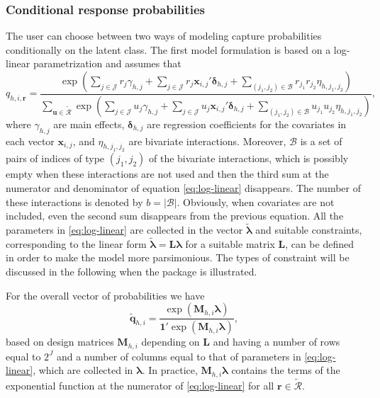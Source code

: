 \subsubsection{Conditional response probabilities}
%
The user can choose between two ways of modeling capture probabilities conditionally on the latent class.
The first model formulation is based on a log-linear parametrization and assumes that
%
\begin{equation}
q_{h,i,\bm{r}} = \frac{\exp\left(\sum_{j\in\mathcal{J}}r_j\gamma_{h,j}+\sum_{j\in\mathcal{J}}r_j\bm{x}_{i,j}'\bm{\delta}_{h,j}+
\sum_{(j_1,j_2)\in\mathcal{B}}r_{j_1}r_{j_2}\eta_{h,j_1,j_2}\right)}{\sum_{\bm{u}\in\tilde{\mathcal{R}}}\exp\left(\sum_{j\in\mathcal{J}}u_j\gamma_{h,j}+\sum_{j\in\mathcal{J}}u_j\bm{x}_{i,j}'\bm{\delta}_{h,j}+
\sum_{(j_1,j_2)\in\mathcal{B}}u_{j_1}u_{j_2}\eta_{h,j_1,j_2}\right)},\label{eq:log-linear}
\end{equation}
%
where $\gamma_{h,j}$ are main effects, $\bm{\delta}_{h,j}$ are regression coefficients for the covariates in each vector $\bm{x}_{i,j}$, and $\eta_{h,j_1,j_2}$ are bivariate interactions.
Moreover, $\mathcal{B}$ is a set of pairs of indices of type $(j_1,j_2)$ of the bivariate interactions, which is possibly empty when these interactions are not used and then the third sum at the numerator and denominator of equation \eqref{eq:log-linear} disappears.
The number of these interactions is denoted by $b=|\mathcal{B}|$.
Obviously, when covariates are not included, even the second sum disappears from the previous equation.
All the parameters in \eqref{eq:log-linear} are collected in the vector $\tilde{\bm{\lambda}}$ and suitable constraints, corresponding to the linear form $\tilde{\bm{\lambda}}=\bm{L}\bm{\lambda}$ for a suitable matrix $\bm{L}$, can be defined in order to make the model more parsimonious.
The types of constraint will be discussed in the following when the package is illustrated.

For the overall vector of probabilities we have
\begin{equation}\label{eq:log-linear_matrix}
\tilde{\bm{q}}_{h,i} = \frac{\exp(\bm{M}_{h,i}\bm{\lambda})}{\bm{1}'\exp(\bm{M}_{h,i}\bm{\lambda})},
\end{equation}
based on design matrices $\bm{M}_{h,i}$ depending on $\bm{L}$ and having a number of rows equal to $2^J$ and a number of columns equal to that of parameters in \eqref{eq:log-linear}, which are collected in $\bm{\lambda}$.
In practice, $\bm{M}_{h,i}\bm{\lambda}$ contains the terms of the exponential function at the numerator of \eqref{eq:log-linear} for all $\bm{r}\in\tilde{\mathcal{R}}$.

